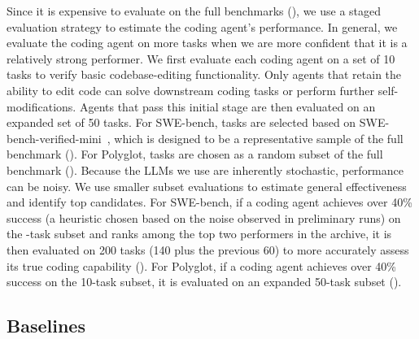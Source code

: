 Since it is expensive to evaluate on the full benchmarks (), we use a staged evaluation strategy to estimate the coding agent's performance. In general, we evaluate the coding agent on more tasks when we are more confident that it is a relatively strong performer. We first evaluate each coding agent on a set of 10 tasks to verify basic codebase-editing functionality. Only agents that retain the ability to edit code can solve downstream coding tasks or perform further self-modifications. Agents that pass this initial stage are then evaluated on an expanded set of 50 tasks. For SWE-bench, tasks are selected based on SWE-bench-verified-mini~\citep{hobbhahn2025swebenchmini}, which is designed to be a representative sample of the full benchmark (). For Polyglot, tasks are chosen as a random subset of the full benchmark (). Because the LLMs we use are inherently stochastic, performance can be noisy. We use smaller subset evaluations to estimate general effectiveness and identify top candidates. For SWE-bench, if a coding agent achieves over 40\% success (a heuristic chosen based on the noise observed in preliminary runs) on the \DgmSweBenchStageTasks{}-task subset and ranks among the top two performers in the archive, it is then evaluated on 200 tasks (140 plus the previous 60) to more accurately assess its true coding capability (). For Polyglot, if a coding agent achieves over 40\% success on the 10-task subset, it is evaluated on an expanded 50-task subset ().

\subsection{Baselines}
\label{sec:baselines}

